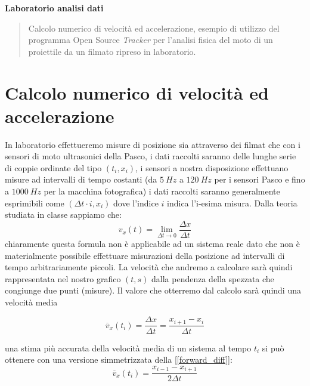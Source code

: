 \documentclass[a4paper,10pt,oneside]{article}
\begin{document}
\thispagestyle{empty}

\begin{center}
{\huge \textbf{Laboratorio analisi dati}}
\end{center}

\vspace{1cm}

\begin{abstract}
Calcolo numerico di velocità ed accelerazione, esempio di utilizzo del programma Open Source \emph{Tracker} per l'analisi fisica del moto di un proiettile da un filmato ripreso in laboratorio.

\end{abstract}

\section*{Calcolo numerico di velocità ed accelerazione}
In laboratorio effettueremo misure di posizione sia attraverso dei filmat che con i sensori di moto ultrasonici della Pasco, i dati raccolti saranno delle lunghe serie di coppie ordinate del tipo $(t_i,x_i)$, i sensori a nostra disposizione effettuano misure ad intervalli di tempo costanti (da $5\ Hz$ a $120\ Hz$ per i sensori Pasco e fino a $1000\ Hz$ per la macchina fotografica) i  dati raccolti saranno generalmente esprimibili come $(\Delta t\cdot i,x_i)$ dove l'indice $i$ indica l'i-esima misura.
Dalla teoria studiata in classe sappiamo che:
\begin{equation}
 v_x(t)=\lim _{\Delta t \to 0} \frac {\Delta x}{\Delta t}
\end{equation}
chiaramente questa formula non è applicabile ad un sistema reale dato che non è materialmente possibile effettuare misurazioni della posizione ad intervalli di tempo arbitrariamente piccoli. La velocità che andremo a calcolare sarà quindi rappresentata nel nostro grafico $(t,s)$ dalla pendenza della spezzata che congiunge due punti (misure). Il valore che otterremo dal calcolo sarà quindi una velocità media

\begin{equation}\label{forward_diff}
\overline{v}_x(t_i)=\frac{\Delta x}{\Delta t}=\frac{x_{i+1}-x_i}{\Delta t}
\end{equation}

una stima più accurata della velocità media di un sistema al tempo $t_i$ si può ottenere con una versione simmetrizzata della [\ref{forward_diff}]:
\begin{equation}
 \overline{v}_x(t_i)=\frac{x_{i-1}-x_{i+1}}{2\Delta t}
\end{equation}
\end{document}
